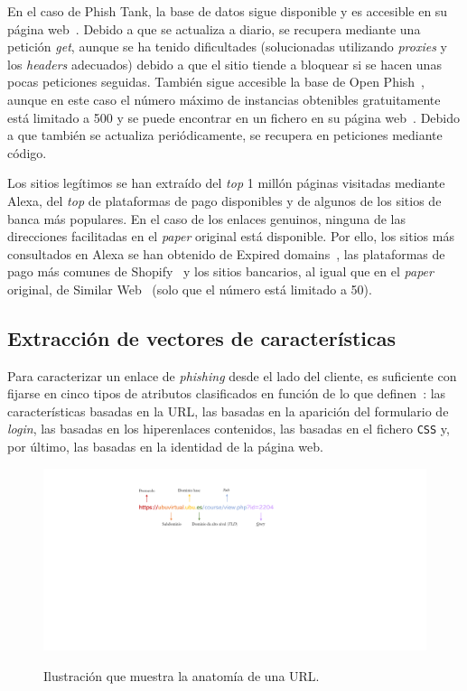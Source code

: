 En el caso de Phish Tank, la base de datos sigue disponible y es accesible en su página web~\cite{phishTankDB}. Debido a que se actualiza a diario, se recupera mediante una petición \textit{get}, aunque se ha tenido dificultades (solucionadas utilizando \textit{proxies} y los \textit{headers} adecuados) debido a que el sitio tiende a bloquear si se hacen unas pocas peticiones seguidas. También sigue accesible la base de Open Phish~\cite{openFishDB}, aunque en este caso el número máximo de instancias obtenibles gratuitamente está limitado a 500 y se puede encontrar en un fichero en su página web~\cite{openFishFile}. Debido a que también se actualiza periódicamente, se recupera en peticiones mediante código.

Los sitios legítimos se han extraído del \textit{top} 1 millón páginas visitadas mediante Alexa, del \textit{top} de plataformas de pago disponibles y de algunos de los sitios de banca más populares. En el caso de los enlaces genuinos, ninguna de las direcciones facilitadas en el \textit{paper} original está disponible. Por ello, los sitios más consultados en Alexa se han obtenido de Expired domains~\cite{AlexaTopWebsites}, las plataformas de pago más comunes de Shopify~\cite{paymentGatewaysWebsites} y los sitios bancarios, al igual que en el \textit{paper} original, de Similar Web~\cite{banksitesTop} (solo que el número está limitado a 50).

\subsection{Extracción de vectores de características}

Para caracterizar un enlace de \textit{phishing} desde el lado del cliente, es suficiente con fijarse en cinco tipos de atributos clasificados en función de lo que definen~\cite{featuresPhishing2018Gupta}: las características basadas en la URL, las basadas en la aparición del formulario de \textit{login}, las  basadas en los hiperenlaces contenidos, las basadas en el fichero \texttt{CSS} y, por último, las basadas en la identidad de la página web.


\begin{figure}[h]
	\caption[\textit{Phishing}: Anatomía de una URL.]{Ilustración que muestra la anatomía de una URL.}
	\centering
	\includegraphics[scale=1]{../img/memoria/5_url_anatomia.pdf}
	\label{img:5_url_anatomia}
\end{figure}



